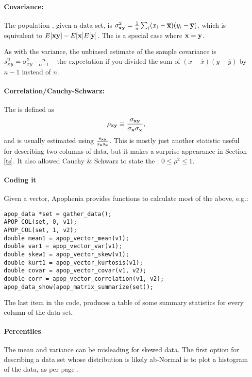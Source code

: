 \paragraph{Covariance:} The population , given a data set,
is $\sigma^2_{{\bf x}{\bf y}} = {1\over n}\sum_i(x_i-\overline {{\bf x}})(y_i-\overline {{\bf y}})$, which is equivalent
to $E[{\bf x}{\bf y}]-E[{\bf x}]E[{\bf y}]$. The  is a special case where ${\bf x}={\bf y}$.

As with the variance, the unbiased estimate of the 
sample covariance is $s^2_{xy}=\sigma^2_{xy}\cdot {n\over n-1}$---the
expectation if you  divided the sum of $(x-\overline x)(y-\overline y)$ by
$n-1$ instead of $n$.

\paragraph{Correlation/Cauchy-Schwarz:} The  is
defined as $$\rho_{\xv\yv}\equiv{\sigma_{\xv\yv}\over \sigma_\xv
\sigma_\xv},$$ and is usually estimated using ${s_{{\bf x}{\bf y}}\over
s_{\bf x} s_{\bf x}}$.  This is mostly just another statistic useful for
describing two columns of data, but it makes a surprise appearance
in Section \ref{ts}. It also allowed Cauchy \& Schwarz to state
the : $0\leq \rho^2 \leq 1$.
\label{correlation}

\paragraph{Coding it} Given a vector, Apophenia provides functions to
calculate most of the above, e.g.:

 
 
\begin{lstlisting}
apop_data *set = gather_data();
APOP_COL(set, 0, v1);
APOP_COL(set, 1, v2);
double mean1 = apop_vector_mean(v1);
double var1 = apop_vector_var(v1);
double skew1 = apop_vector_skew(v1);
double kurt1 = apop_vector_kurtosis(v1);
double covar = apop_vector_covar(v1, v2);
double corr = apop_vector_correlation(v1, v2);
apop_data_show(apop_matrix_summarize(set));
\end{lstlisting}
The last item in the code,  produces a table of
some summary statistics for every column of the data set.

\paragraph{Percentiles}  The mean and variance can be misleading for
skewed data. The first option for describing a data set whose
distribution is likely ab-Normal is to plot a histogram of the data, as
per page \pageref{histosec}.

